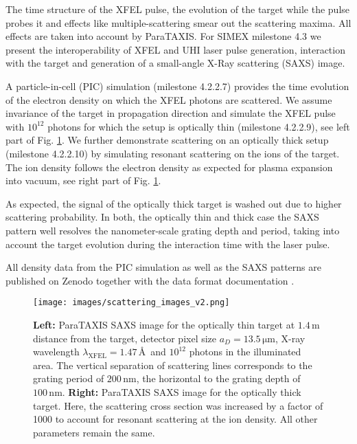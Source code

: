 The time structure of the XFEL pulse, the evolution of the target while the pulse probes it and effects like multiple-scattering smear out the scattering maxima. All effects are taken into account by ParaTAXIS. For SIMEX milestone 4.3 we present the interoperability of XFEL and UHI laser pulse generation, interaction with the target and generation of a small-angle X-Ray scattering (SAXS) image.

A particle-in-cell (PIC) simulation (milestone 4.2.2.7) provides the time evolution of the electron density on which the XFEL photons are scattered. We assume invariance of the target in propagation direction and simulate the XFEL pulse with $10^{12}$ photons for which the setup is optically thin (milestone 4.2.2.9), see left part of Fig. \ref{fig:scattering}. We further demonstrate scattering on an optically thick setup (milestone 4.2.2.10) by simulating resonant scattering on the ions of the target. The ion density follows the electron density as expected for plasma expansion into vacuum\cite{Mora2003}, see right part of Fig. \ref{fig:scattering}.

As expected, the signal of the optically thick target is washed out due to higher scattering probability. In both, the optically thin and thick case the SAXS pattern well resolves the nanometer-scale grating depth and period, taking into account the target evolution during the interaction time with the laser pulse.

All density data from the PIC simulation as well as the SAXS patterns are published on Zenodo together with the data format documentation \cite{Garten2017}.

\begin{figure}
\centering
  \texttt{[image: images/scattering\_images\_v2.png]}
\caption{
\textbf{Left:} ParaTAXIS SAXS image for the optically thin target at $1.4\,\mathrm{m}$ distance from the target, detector pixel size $a_D = 13.5\,\mathrm{\mu m}$, X-ray wavelength $\lambda_\mathrm{XFEL} = 1.47\,$\AA\ and $10^{12}$ photons in the illuminated area. The vertical separation of scattering lines corresponds to the grating period of $200\,\mathrm{nm}$, the horizontal to the grating depth of $100\,\mathrm{nm}$.
\textbf{Right:} ParaTAXIS SAXS image for the optically thick target. Here, the scattering cross section was increased by a factor of 1000 to account for resonant scattering at the ion density. All other parameters remain the same.
}
  \label{fig:scattering}
\end{figure}



